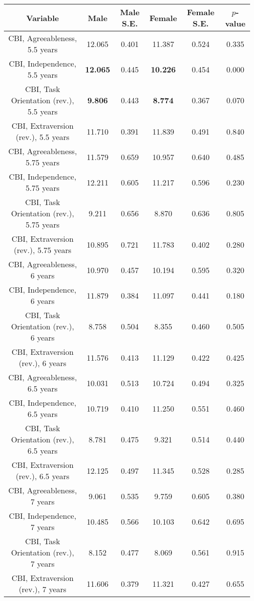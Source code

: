 \begin{longtable}{c c c c c c}
\toprule
\textbf{Variable} & \textbf{Male} & \textbf{Male S.E.}  & \textbf{Female} & \textbf{Female S.E.} & \textbf{$ p $-value} \\
\midrule
CBI, Agreeableness, 5.5 years & 12.065 & 0.401 &  11.387 & 0.524 & 0.335 \\
CBI, Independence, 5.5 years & \textbf{12.065} & 0.445 &  \textbf{10.226} & 0.454 & 0.000 \\
CBI, Task Orientation (rev.), 5.5 years & \textbf{9.806} & 0.443 &  \textbf{8.774} & 0.367 & 0.070 \\
CBI, Extraversion (rev.), 5.5 years & 11.710 & 0.391 &  11.839 & 0.491 & 0.840 \\
CBI, Agreeableness, 5.75 years & 11.579 & 0.659 &  10.957 & 0.640 & 0.485 \\
CBI, Independence, 5.75 years & 12.211 & 0.605 &  11.217 & 0.596 & 0.230 \\
CBI, Task Orientation (rev.), 5.75 years & 9.211 & 0.656 &  8.870 & 0.636 & 0.805 \\
CBI, Extraversion (rev.), 5.75 years & 10.895 & 0.721 &  11.783 & 0.402 & 0.280 \\
CBI, Agreeableness, 6 years & 10.970 & 0.457 &  10.194 & 0.595 & 0.320 \\
CBI, Independence, 6 years & 11.879 & 0.384 &  11.097 & 0.441 & 0.180 \\
CBI, Task Orientation (rev.), 6 years & 8.758 & 0.504 &  8.355 & 0.460 & 0.505 \\
CBI, Extraversion (rev.), 6 years & 11.576 & 0.413 &  11.129 & 0.422 & 0.425 \\
CBI, Agreeableness, 6.5 years & 10.031 & 0.513 &  10.724 & 0.494 & 0.325 \\
CBI, Independence, 6.5 years & 10.719 & 0.410 &  11.250 & 0.551 & 0.460 \\
CBI, Task Orientation (rev.), 6.5 years & 8.781 & 0.475 &  9.321 & 0.514 & 0.440 \\
CBI, Extraversion (rev.), 6.5 years & 12.125 & 0.497 &  11.345 & 0.528 & 0.285 \\
CBI, Agreeableness, 7 years & 9.061 & 0.535 &  9.759 & 0.605 & 0.380 \\
CBI, Independence, 7 years & 10.485 & 0.566 &  10.103 & 0.642 & 0.695 \\
CBI, Task Orientation (rev.), 7 years & 8.152 & 0.477 &  8.069 & 0.561 & 0.915 \\
CBI, Extraversion (rev.), 7 years & 11.606 & 0.379 &  11.321 & 0.427 & 0.655 \\

\end{longtable}

